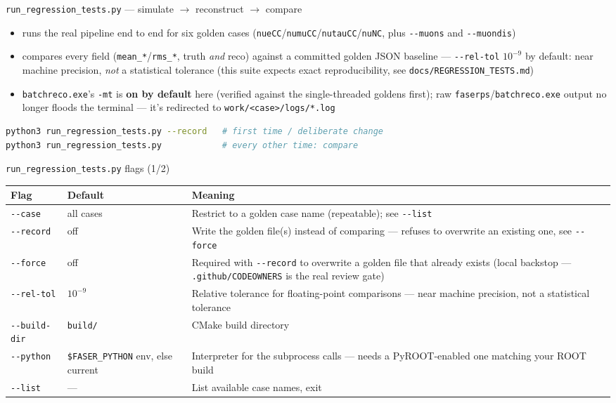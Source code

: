 \documentclass[aspectratio=169]{beamer}
\begin{document}
\begin{frame}[fragile]{\texttt{run\_regression\_tests.py} --- simulate
    $\to$ reconstruct $\to$ compare}
  \begin{itemize}
    \item runs the real pipeline end to end for six golden cases
      (\texttt{nueCC}/\texttt{numuCC}/\texttt{nutauCC}/\texttt{nuNC}, plus
      \texttt{-{}-muons} and \texttt{-{}-muondis})
    \item compares every field (\texttt{mean\_*}/\texttt{rms\_*}, truth
      \emph{and} reco) against a committed golden JSON baseline ---
      \texttt{-{}-rel-tol} $10^{-9}$ by default: near machine precision,
      \emph{not} a statistical tolerance (this suite expects exact
      reproducibility, see \texttt{docs/REGRESSION\_TESTS.md})
    \item \texttt{batchreco.exe}'s \texttt{-mt} is \textbf{on by default}
      here (verified against the single-threaded goldens first); raw
      \texttt{faserps}/\texttt{batchreco.exe} output no longer floods the
      terminal --- it's redirected to \texttt{work/<case>/logs/*.log}
  \end{itemize}
\begin{lstlisting}[language=bash]
python3 run_regression_tests.py --record   # first time / deliberate change
python3 run_regression_tests.py            # every other time: compare
\end{lstlisting}
\end{frame}

\begin{frame}{\texttt{run\_regression\_tests.py} flags (1/2)}
  \centering
  \scriptsize
  \begin{tabular}{@{}p{2.6cm}p{1.6cm}p{6.6cm}@{}}
    \toprule
    \textbf{Flag} & \textbf{Default} & \textbf{Meaning} \\
    \midrule
    \texttt{-{}-case} & all cases & Restrict to a golden case name
      (repeatable); see \texttt{-{}-list} \\
    \texttt{-{}-record} & off & Write the golden file(s) instead of
      comparing --- refuses to overwrite an existing one, see
      \texttt{-{}-force} \\
    \texttt{-{}-force} & off & Required with \texttt{-{}-record} to
      overwrite a golden file that already exists (local backstop ---
      \texttt{.github/CODEOWNERS} is the real review gate) \\
    \texttt{-{}-rel-tol} & $10^{-9}$ & Relative tolerance for floating-point
      comparisons --- near machine precision, not a statistical tolerance \\
    \texttt{-{}-build-dir} & \texttt{build/} & CMake build directory \\
    \texttt{-{}-python} & \texttt{\$FASER\_PYTHON} env, else current &
      Interpreter for the subprocess calls --- needs a PyROOT-enabled one
      matching your ROOT build \\
    \texttt{-{}-list} & --- & List available case names, exit \\
    \bottomrule
  \end{tabular}
\end{frame}
\end{document}
